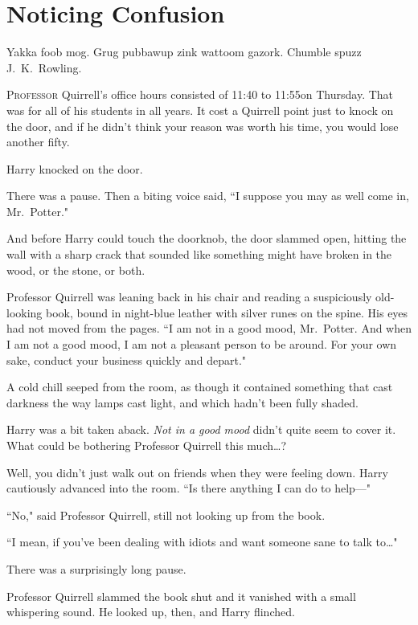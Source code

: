 \chapter{Noticing Confusion}

\begin{chapterOpeningAuthorNote}
Yakka foob mog. Grug pubbawup zink wattoom gazork. Chumble spuzz J.~K.~Rowling.
\end{chapterOpeningAuthorNote}

\lettrine{P}{rofessor} Quirrell's office hours consisted of 11:40 to 11:55\am on Thursday. That was for all of his students in all years. It cost a Quirrell point just to knock on the door, and if he didn't think your reason was worth his time, you would lose another fifty.

Harry knocked on the door.

There was a pause. Then a biting voice said, ``I suppose you may as well come in, Mr.~Potter."

And before Harry could touch the doorknob, the door slammed open, hitting the wall with a sharp crack that sounded like something might have broken in the wood, or the stone, or both.

Professor Quirrell was leaning back in his chair and reading a suspiciously old-looking book, bound in night-blue leather with silver runes on the spine. His eyes had not moved from the pages. ``I am not in a good mood, Mr.~Potter. And when I am not a good mood, I am not a pleasant person to be around. For your own sake, conduct your business quickly and depart."

A cold chill seeped from the room, as though it contained something that cast darkness the way lamps cast light, and which hadn't been fully shaded.

Harry was a bit taken aback. \emph{Not in a good mood} didn't quite seem to cover it. What could be bothering Professor Quirrell this much{\ldots}?

Well, you didn't just walk out on friends when they were feeling down. Harry cautiously advanced into the room. ``Is there anything I can do to help—"

``No," said Professor Quirrell, still not looking up from the book.

``I mean, if you've been dealing with idiots and want someone sane to talk to{\ldots}"

There was a surprisingly long pause.

Professor Quirrell slammed the book shut and it vanished with a small whispering sound. He looked up, then, and Harry flinched.

